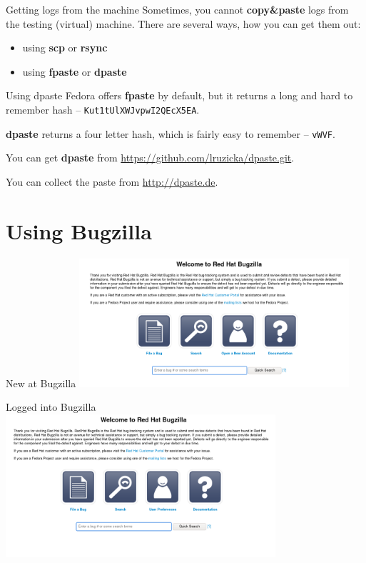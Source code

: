 \documentclass[12pt]{beamer}
\begin{document}
\begin{frame}{Getting logs from the machine}
Sometimes, you cannot \textbf{copy\&paste} logs from the testing (virtual) machine. There are several ways, how you can get them out:

\begin{itemize}
 \item using \textbf{scp} or \textbf{rsync}
 \item using \textbf{fpaste} or \textbf{dpaste}	
\end{itemize}
\end{frame}

\begin{frame}{Using dpaste}
Fedora offers \textbf{fpaste} by default, but it returns a long and hard to remember hash -- \texttt{Kut1tUlXWJvpwI2QEcX5EA}. 

\vspace{5pt}

\textbf{dpaste} returns a four letter hash, which is fairly easy to remember -- \texttt{vWVF}.

\vspace{5pt}

You can get \textbf{dpaste} from {\color{blue}\url{https://github.com/lruzicka/dpaste.git}}.

\vspace{5pt}

You can collect the paste from {\color{blue}\url{http://dpaste.de}}.

\end{frame}

\section{Using Bugzilla}
\begin{frame}{New at Bugzilla}
\includegraphics[width=10cm]{images/bz_new.png}
\end{frame}

\begin{frame}{Logged into Bugzilla}
\includegraphics[width=10cm]{images/bz_logged.png}
\end{frame}
\end{document}
